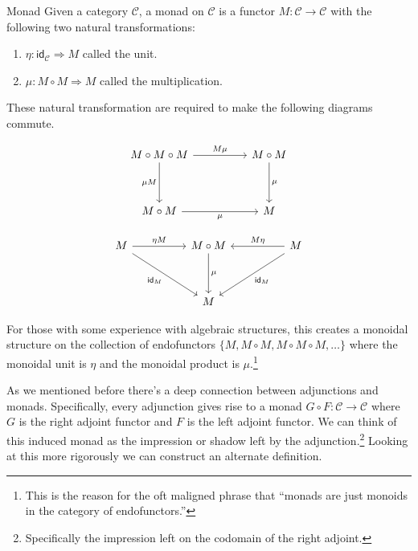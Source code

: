 \documentclass[12pt]{article}
\begin{document}
\begin{definition}{Monad}{}
    Given a category $\mathcal{C}$, a monad on $\mathcal{C}$ is a functor $M:\mathcal{C}\rightarrow\mathcal{C}$ with the following two natural transformations:
    \begin{enumerate}
        \item $\eta : \mathsf{id}_{\mathcal{C}} \Rightarrow M$ called the unit.
        \item $\mu: M\circ M \Rightarrow M$ called the multiplication.
    \end{enumerate}
    These natural transformation are required to make the following diagrams commute.

    \[\begin{tikzcd}
            M\circ M\circ M && M\circ M \\
            \\
            M\circ M && M
            \arrow["M\mu", from=1-1, to=1-3]
            \arrow["\mu", from=1-3, to=3-3]
            \arrow["\mu"', from=3-1, to=3-3]
            \arrow["{\mu M}"', from=1-1, to=3-1]
        \end{tikzcd}\]

    \[\begin{tikzcd}
            M && M\circ M && M \\
            \\
            && M
            \arrow["{\eta M}", from=1-1, to=1-3]
            \arrow["M\eta"', from=1-5, to=1-3]
            \arrow["\mu", from=1-3, to=3-3]
            \arrow["{\mathsf{id}_M}", from=1-5, to=3-3]
            \arrow["{\mathsf{id}_M}"', from=1-1, to=3-3]
        \end{tikzcd}\]

    For those with some experience with algebraic structures, this creates a monoidal structure on the collection of endofunctors $\{M, M\circ M, M\circ M\circ M,\dots\}$ where the monoidal unit is $\eta$ and the monoidal product is $\mu$.\footnote{This is the reason for the oft maligned phrase that ``monads are just monoids in the category of endofunctors.''}
\end{definition}

As we mentioned before there's a deep connection between adjunctions and monads.
Specifically, every adjunction gives rise to a monad $G \circ F: \mathcal{C} \rightarrow \mathcal{C}$ where $G$ is the right adjoint functor and $F$ is the left adjoint functor.
We can think of this induced monad as the impression or shadow left by the adjunction.\footnote{Specifically the impression left on the codomain of the right adjoint.}
Looking at this more rigorously we can construct an alternate definition.
\end{document}
